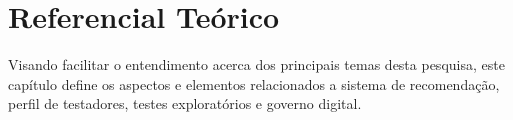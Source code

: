 \chapter{Referencial Teórico}
\label{ch:referencial}

Visando facilitar o entendimento acerca dos principais temas desta pesquisa, este capítulo define os aspectos e elementos relacionados a sistema de
recomendação, perfil de testadores, testes exploratórios e governo digital.






